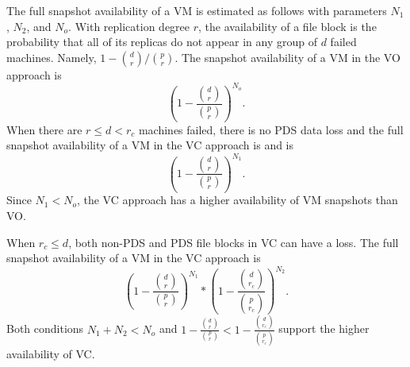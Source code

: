  The full snapshot availability of a VM is estimated as follows with parameters $N_1$, $N_2$, and $N_o$.
With replication degree $r$, the availability of a file block is the probability that  
all of its replicas do not appear in any group of $d$ failed machines. 
Namely, $1-\binom{d}{r}/ \binom{p}{r}$. 
The snapshot availability of a VM  in the VO approach is
\[ 
(1-\frac{ \binom{d}{r}} { \binom{p}{r} })^{N_o}. 
\]
When there are $r \le d<r_c$ machines failed,  there is no PDS data loss and  
the full snapshot availability of a VM in the VC approach is 
and is
\[
(1-\frac{\binom{d}{r}} { \binom{p}{r} })^{N_1}.
\]
Since $N_1 <N_o$, the VC approach has a higher availability of VM snapshots than VO.

When $r_c \leq d$, both non-PDS and PDS file blocks in VC can have a loss.
The full snapshot availability of  a VM in the VC approach is
\[
(1-\frac{ \binom{d}{r}} { \binom{p}{r} })^{N_1} 
*
(1-\frac{ \binom{d}{r_c}} { \binom{p}{r_c} })^{N_2}.
\]
Both conditions $N_1+N_2 <N_o$ 
and  $1-\frac{ \binom{d}{r}} { \binom{p}{r} }
< 1-\frac{ \binom{d}{r_c}} { \binom{p}{r_c} }$
support the higher availability of VC.






